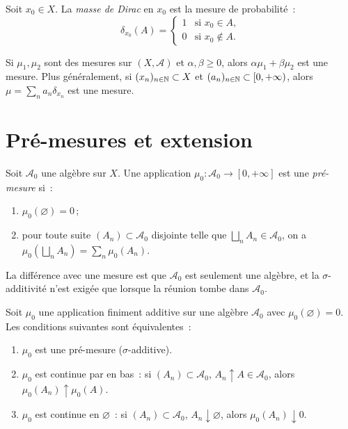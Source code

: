 \begin{exemple}
Soit $x_0 \in X$. La \emph{masse de Dirac} en $x_0$ est la mesure de probabilit\'e~:
\[
\delta_{x_0}(A) = \begin{cases} 1 & \text{si } x_0 \in A, \\ 0 & \text{si }
x_0 \notin A. \end{cases}
\]
\end{exemple}

\begin{exemple}
Si $\mu_1, \mu_2$ sont des mesures sur $(X, \mathcal{A})$ et $\alpha, \beta \geq 0$,
alors $\alpha \mu_1 + \beta \mu_2$ est une mesure. Plus g\'en\'eralement, si
$(x_n)_{n \in \mathbb{N}} \subset X$ et $(a_n)_{n \in \mathbb{N}} \subset [0, +\infty)$, alors
$\mu = \sum_n a_n \delta_{x_n}$ est une mesure.
\end{exemple}

\section{Pr\'e-mesures et extension}

\begin{definition}[Pr\'e-mesure]
Soit $\mathcal{A}_0$ une alg\`ebre sur $X$. Une application
$\mu_0 : \mathcal{A}_0 \to [0, +\infty]$ est une \emph{pr\'e-mesure} si~:
\begin{enumerate}
    \item[(i)] $\mu_0(\varnothing) = 0$\,;
    \item[(ii)] pour toute suite $(A_n) \subset \mathcal{A}_0$ disjointe telle que
    $\bigsqcup_n A_n \in \mathcal{A}_0$, on a
    $\mu_0\!\left(\bigsqcup_n A_n\right) = \sum_n \mu_0(A_n)$.
\end{enumerate}
\end{definition}

\begin{remarque}
La diff\'erence avec une mesure est que $\mathcal{A}_0$ est seulement une alg\`ebre,
et la $\sigma$-additivit\'e n'est exig\'ee que lorsque la r\'eunion tombe dans
$\mathcal{A}_0$.
\end{remarque}

\begin{proposition}
\label{prop:critere_sigma_add}
Soit $\mu_0$ une application finiment additive sur une alg\`ebre $\mathcal{A}_0$
avec $\mu_0(\varnothing) = 0$. Les conditions suivantes sont \'equivalentes~:
\begin{enumerate}
    \item $\mu_0$ est une pr\'e-mesure ($\sigma$-additive).
    \item $\mu_0$ est continue par en bas~: si $(A_n) \subset \mathcal{A}_0$,
    $A_n \uparrow A \in \mathcal{A}_0$, alors $\mu_0(A_n) \uparrow \mu_0(A)$.
    \item $\mu_0$ est continue en $\varnothing$~: si $(A_n) \subset \mathcal{A}_0$,
    $A_n \downarrow \varnothing$, alors $\mu_0(A_n) \downarrow 0$.
\end{enumerate}
\end{proposition}

